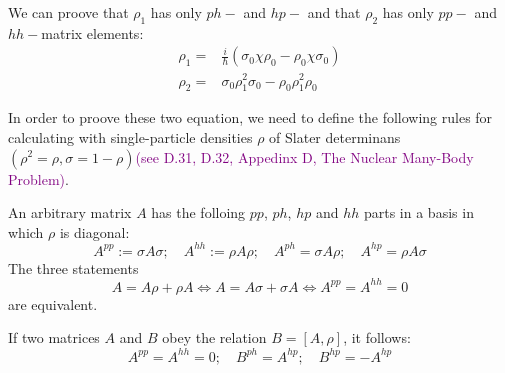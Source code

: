   We can proove that $\rho_1$ has only $ph-$ and $hp-$ and that $\rho_2$ has only $pp-$ and $hh-$matrix elements:
  \begin{align}
    \label{tdhf35} \rho_1 =& \frac{i}{\hbar}(\sigma_0\chi\rho_0-\rho_0\chi\sigma_0)\\        
    \label{tdhf36} \rho_2 =& \sigma_0\rho_1^2\sigma_0 - \rho_0\rho_1^2\rho_0                 
  \end{align}
  \begin{note}
    In order to proove these two equation, we need to define the following rules for calculating with single-particle densities $\rho$ of Slater determinans$(\rho^2=\rho, \sigma=1-\rho)$\textcolor{purple}{(see D.31, D.32, Appedinx D, The Nuclear Many-Body Problem)}.

    An arbitrary matrix $A$ has the folloing $pp$, $ph$, $hp$ and $hh$ parts in a basis in which $\rho$ is diagonal:
    \begin{equation}
      A^{pp}:= \sigma A \sigma; \quad  A^{hh}:= \rho A \rho; \quad A^{ph}=\sigma A \rho; \quad A^{hp}=\rho A \sigma \label{tdhf37}
    \end{equation}
    The three statements
    \begin{equation}
      A = A\rho + \rho A \Leftrightarrow A = A\sigma + \sigma A \Leftrightarrow A^{pp}=A^{hh}=0 \label{tdhf38}
    \end{equation}
    are equivalent. 
    
    If two matrices $A$ and $B$ obey the relation $B=[A,\rho]$, it follows:
    \begin{equation}
      A^{pp}=A^{hh}=0; \quad B^{ph} = A^{hp}; \quad B^{hp}=-A^{hp}   \label{tdhf39}
    \end{equation}
  \end{note}
